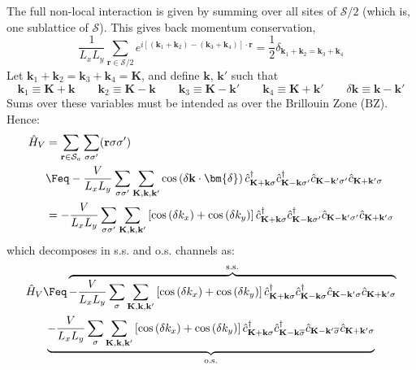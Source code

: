 The full non-local interaction is given by summing over all sites of $\mathcal{S}/2$ (which is, one sublattice of $\mathcal{S}$). This gives back momentum conservation,
\[
	\frac{1}{L_xL_y} \sum_{\mathbf{r} \in \mathcal{S}/2} e^{i \left[ (\mathbf{k}_1 + \mathbf{k}_2) - (\mathbf{k}_3 + \mathbf{k}_4) \right] \cdot \mathbf{r}} = \frac{1}{2} \delta_{\mathbf{k}_1 + \mathbf{k}_2 = \mathbf{k}_3 + \mathbf{k}_4}
\]
Let $\mathbf{k}_1 + \mathbf{k}_2 = \mathbf{k}_3 + \mathbf{k}_4 = \mathbf{K}$, and define $\mathbf{k}$, $\mathbf{k}'$ such that
\[
	\mathbf{k}_1 \equiv \mathbf{K} + \mathbf{k}
	\qquad
	\mathbf{k}_2 \equiv \mathbf{K} - \mathbf{k}
	\qquad
	\mathbf{k}_3 \equiv \mathbf{K} - \mathbf{k}'
	\qquad
	\mathbf{k}_4 \equiv \mathbf{K} + \mathbf{k}'
	\qquad
	\delta \mathbf{k} \equiv \mathbf{k}-\mathbf{k}'
\]
Sums over these variables must be intended as over the Brillouin Zone ($\mathrm{BZ}$). Hence:
\begin{align}
	\hat H_V &= \sum_{\mathbf{r} \in \mathcal{S}_a} \sum_{\sigma\sigma'} (\mathbf{r}\sigma\sigma') \nonumber \\
	&\Feq - \frac{V}{L_x L_y} \sum_{\sigma\sigma'} \sum_{\mathbf{K}, \mathbf{k}, \mathbf{k}'} \cos\left(
		\delta \mathbf{k} \cdot \bm{\delta}
	\right)	\hat c_{\mathbf{K}+\mathbf{k} \sigma}^\dagger \hat c_{\mathbf{K}-\mathbf{k} \sigma'}^\dagger \hat c_{\mathbf{K}-\mathbf{k}' \sigma'} \hat c_{\mathbf{K}+\mathbf{k}'\sigma} \nonumber \\
	&= - \frac{V}{L_x L_y} 	\sum_{\sigma\sigma'}
	\sum_{\mathbf{K}, \mathbf{k}, \mathbf{k}'} \left[
		\cos \left(
			\delta k_x
		\right)	+ \cos \left(
		\delta k_y
			\right)	
	\right]	\hat c_{\mathbf{K}+\mathbf{k} \sigma}^\dagger \hat c_{\mathbf{K}-\mathbf{k} \sigma'}^\dagger \hat c_{\mathbf{K}-\mathbf{k}' \sigma'} \hat c_{\mathbf{K}+\mathbf{k}'\sigma} \label{eq:HV-fourier}
\end{align}
which decomposes in s.s. and o.s. channels as:
\begin{multline*}
	\hat H_V \Feq 
	\overbrace{
		- \frac{V}{L_x L_y} \sum_{\sigma}
		\sum_{\mathbf{K}, \mathbf{k}, \mathbf{k}'} \left[
		\cos \left(
		\delta k_x
		\right)	+ \cos \left(
		\delta k_y
		\right)	
		\right]	\hat c_{\mathbf{K}+\mathbf{k} \sigma}^\dagger \hat c_{\mathbf{K}-\mathbf{k}\sigma}^\dagger \hat c_{\mathbf{K}-\mathbf{k}'\sigma} \hat c_{\mathbf{K}+\mathbf{k}'\sigma}
	}^{\mathrm{s.s.}} \\
	\underbrace{
		- \frac{V}{L_x L_y} \sum_{\sigma}
		\sum_{\mathbf{K}, \mathbf{k}, \mathbf{k}'} \left[
		\cos \left(
		\delta k_x
		\right)	+ \cos \left(
		\delta k_y
		\right)	
		\right]	\hat c_{\mathbf{K}+\mathbf{k} \sigma}^\dagger \hat c_{\mathbf{K}-\mathbf{k}\overline{\sigma}}^\dagger \hat c_{\mathbf{K}-\mathbf{k}'\overline{\sigma}} \hat c_{\mathbf{K}+\mathbf{k}'\sigma}
	}_{\mathrm{o.s.}}
\end{multline*}
